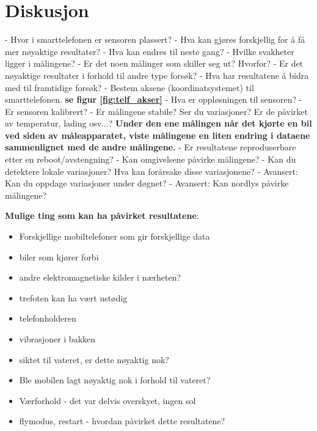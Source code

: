 \section{Diskusjon}

- Hvor i smarttelefonen er sensoren plassert? \newline 
- Hva kan gjøres forskjellig for å få mer nøyaktige resultater? - Hva kan endres til neste gang? \newline
- Hvilke svakheter ligger i målingene? \newline
- Er det noen målinger som skiller seg ut? Hvorfor? \newline
- Er det nøyaktige resultater i forhold til andre type forsøk? \newline 
- Hva har resultatene å bidra med til framtidige forsøk? \newline                                    
- Bestem aksene (koordinatsystemet) til smarttelefonen. \textbf{se figur \ref{fig:telf_akser} }\newline 
- Hva er oppløsningen til sensoren? \newline 
- Er sensoren kalibrert? \newline
- Er målingene stabile? Ser du variasjoner? Er de påvirket av temperatur, lading
osv...? \textbf{Under den ene målingen når det kjørte en bil ved siden av måleapparatet, viste målingene en liten endring i dataene sammenlignet med de andre målingene. }\newline
- Er resultatene reproduserbare etter en reboot/avstengning? \newline
- Kan omgivelsene påvirke målingene? \newline                      
- Kan du detektere lokale variasjoner? Hva kan forårsake disse variasjonene?  \newline
- Avansert: Kan du oppdage variasjoner under døgnet? \newline
- Avansert: Kan nordlys påvirke målingene? \newline 

\noindent\textbf{Mulige ting som kan ha påvirket resultatene}:
\begin{itemize}
    \item Forskjellige mobiltelefoner som gir forskjellige data 
    \item biler som kjører forbi
    \item andre elektromagnetiske kilder i nærheten? 
    \item trefoten kan ha vært ustødig
    \item telefonholderen
    \item vibrasjoner i bakken               
    \item siktet til vateret, er dette nøyaktig nok?
    \item Ble mobilen lagt nøyaktig nok i forhold til vateret?
    \item Værforhold - det var delvis overskyet, ingen sol
    \item flymodus, restart - hvordan påvirket dette resultatene?

\end{itemize}


